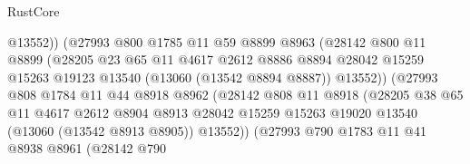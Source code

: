 \begin{lexlean}{RustCore}
\begin{coremodule}
                                  @13552))
                              (@27993
                                @800
                                @1785
                                @11
                                @59
                                @8899
                                @8963
                                (@28142
                                  @800
                                  @11
                                  @8899
                                  (@28205
                                    @23
                                    @65
                                    @11
                                    @4617
                                    @2612
                                    @8886
                                    @8894
                                    @28042
                                    @15259
                                    @15263
                                    @19123
                                    @13540
                                    (@13060 (@13542 @8894 @8887))
                                    @13552))
                                (@27993
                                  @808
                                  @1784
                                  @11
                                  @44
                                  @8918
                                  @8962
                                  (@28142
                                    @808
                                    @11
                                    @8918
                                    (@28205
                                      @38
                                      @65
                                      @11
                                      @4617
                                      @2612
                                      @8904
                                      @8913
                                      @28042
                                      @15259
                                      @15263
                                      @19020
                                      @13540
                                      (@13060 (@13542 @8913 @8905))
                                      @13552))
                                  (@27993
                                    @790
                                    @1783
                                    @11
                                    @41
                                    @8938
                                    @8961
                                    (@28142
                                      @790

\end{coremodule}
\end{lexlean}
